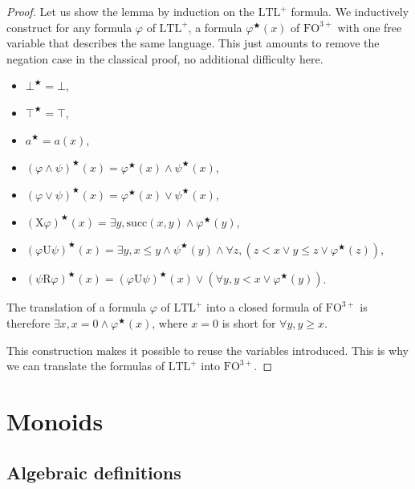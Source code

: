 \documentclass[a4paper,UKenglish,cleveref, autoref, thm-restate]{lipics-v2021}
\newcommand{\FO}{\mathrm{FO}}
\newcommand{\FOthp}{\FO^{3+}}
\newcommand{\LTL}{\mathrm{LTL}}
\newcommand{\LTLp}{\LTL^+}
\newcommand{\X}{\mathrm{X}}
\newcommand{\U}{\mathrm{U}}
\newcommand{\R}{\mathrm{R}}
\newcommand{\toFO}[1]{#1^\bigstar}
\renewcommand{\succ}{\mathrm{succ}}
\begin{document}
\begin{proof}




    Let us show the lemma by induction on the $\LTLp$ formula.
    We inductively construct for any formula $\varphi$ of $\LTLp$, a formula $\varphi^\bigstar(x)$ of $\FOthp$ with one free variable that describes the same language. This just amounts to remove the negation case in the classical proof, no additional difficulty here.

    \begin{itemize}
        \item $\toFO\bot = \bot$,
        \item $\toFO\top = \top$,
        \item $\toFO a = a(x)$,
        \item $\toFO{(\varphi \land \psi)}(x) = \varphi^\bigstar(x) \land \psi^\bigstar(x)$,
        \item $\toFO{(\varphi \lor \psi)}(x) = \varphi^\bigstar(x) \lor \psi^\bigstar(x)$,
        \item $\toFO{(\X \varphi)}(x) = \exists y, \succ(x,y) \land \varphi^\bigstar(y)$,
        \item $\toFO{(\varphi \U \psi)}(x) = \exists y, x \leq y \land \toFO{\psi}(y) \land \forall z, (z < x \lor y \leq z \lor \toFO\varphi(z))$,
        \item $\toFO{(\psi \R \varphi)}(x) = \toFO{(\varphi \U \psi )}(x)\vee(\forall y,y<x\vee \toFO{\varphi}(y))$.
    \end{itemize}

    The translation of a formula $\varphi$ of $\LTLp$ into a closed formula of $\FOthp$ is therefore $\exists x, x=0 \land \toFO\varphi(x)$, where $x=0$ is short for $\forall y, y \geq x$.

    This construction makes it possible to reuse the variables introduced. This is why we can translate the formulas of $\LTLp$ into $\FOthp$.
\end{proof}




\section{Monoids}


\subsection{Algebraic definitions} \label{ap:defmon}
\end{document}
